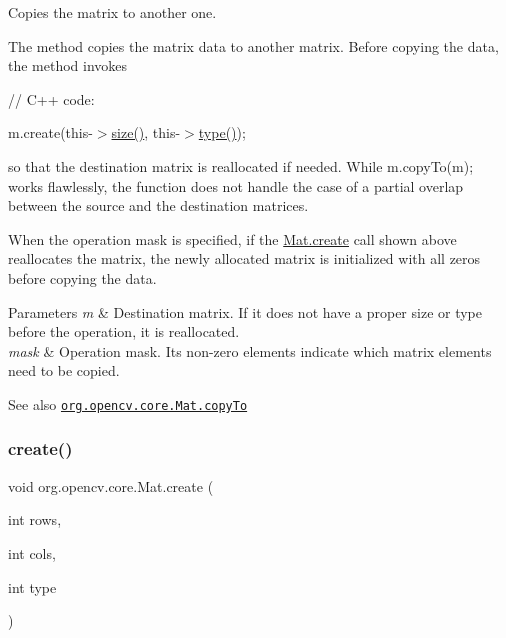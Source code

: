 Copies the matrix to another one.

The method copies the matrix data to another matrix. Before copying the data, the method invokes {\ttfamily }

{\ttfamily }

{\ttfamily }

{\ttfamily // C++ code\+:}

{\ttfamily }

{\ttfamily }

{\ttfamily m.\+create(this-\/$>$\mbox{\hyperlink{classorg_1_1opencv_1_1core_1_1_mat_a543d6f8a103a5f3d899030d76286f0cf}{size()}}, this-\/$>$\mbox{\hyperlink{classorg_1_1opencv_1_1core_1_1_mat_a555bc7243135e2883afe54e7e5e92c79}{type()}});}

{\ttfamily }

{\ttfamily }

{\ttfamily so that the destination matrix is reallocated if needed. While {\ttfamily m.\+copy\+To(m);} works flawlessly, the function does not handle the case of a partial overlap between the source and the destination matrices. }

When the operation mask is specified, if the {\ttfamily \mbox{\hyperlink{classorg_1_1opencv_1_1core_1_1_mat_a539b0a3690afb6b43047b50cbb787fee}{Mat.\+create}}} call shown above reallocates the matrix, the newly allocated matrix is initialized with all zeros before copying the data.


\begin{DoxyParams}{Parameters}
{\em m} & Destination matrix. If it does not have a proper size or type before the operation, it is reallocated. \\
\hline
{\em mask} & Operation mask. Its non-\/zero elements indicate which matrix elements need to be copied.\\
\hline
\end{DoxyParams}
\begin{DoxySeeAlso}{See also}
\href{http://docs.opencv.org/modules/core/doc/basic_structures.html#mat-copyto}{\tt org.\+opencv.\+core.\+Mat.\+copy\+To} 
\end{DoxySeeAlso}
\mbox{\label{classorg_1_1opencv_1_1core_1_1_mat_a539b0a3690afb6b43047b50cbb787fee}} 
\subsubsection{\texorpdfstring{create()}{create()}\hspace{0.1cm}{\footnotesize\ttfamily [1/2]}}
{\footnotesize\ttfamily void org.\+opencv.\+core.\+Mat.\+create (\begin{DoxyParamCaption}\item[{int}]{rows,  }\item[{int}]{cols,  }\item[{int}]{type }\end{DoxyParamCaption})}

